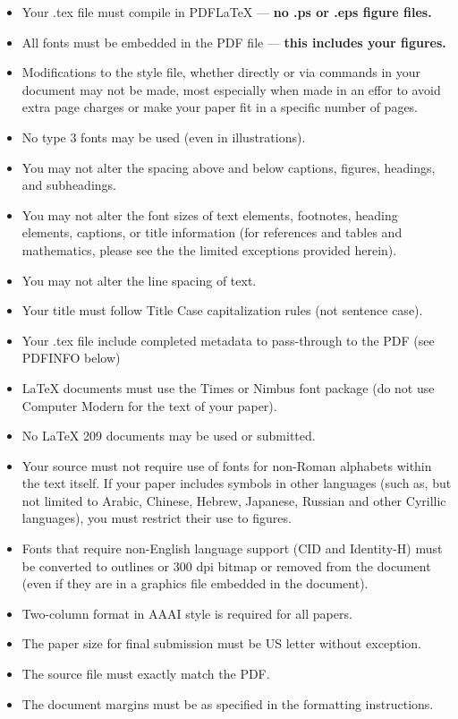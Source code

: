 \documentclass[letterpaper]{article} %
\begin{document}
\begin{itemize}
\item Your .tex file must compile in PDF\LaTeX{} --- \textbf{ no .ps or .eps figure files.}
\item All fonts must be embedded in the PDF file --- \textbf{ this includes your figures.}
\item Modifications to the style file, whether directly or via commands in your document may not be made, most especially when made in an effor to avoid extra page charges or make your paper fit in a specific number of pages.
\item No type 3 fonts may be used (even in illustrations).
\item You may not alter the spacing above and below captions, figures, headings, and subheadings.
\item You may not alter the font sizes of text elements, footnotes, heading elements, captions, or title information (for references and tables and mathematics, please see the the limited exceptions provided herein).
\item You may not alter the line spacing of text.
\item Your title must follow Title Case capitalization rules (not sentence case).
\item Your .tex file include completed metadata to pass-through to the PDF (see PDFINFO below)
\item \LaTeX{} documents must use the Times or Nimbus font package (do not use Computer Modern for the text of your paper).
\item No \LaTeX{} 209 documents may be used or submitted.
\item Your source must not require use of fonts for non-Roman alphabets within the text itself. If your paper includes symbols in other languages (such as, but not limited to Arabic, Chinese, Hebrew, Japanese, Russian and other Cyrillic languages), you must restrict their use to figures.
\item Fonts that require non-English language support (CID and Identity-H) must be converted to outlines or 300 dpi bitmap or removed from the document (even if they are in a graphics file embedded in the document).
\item Two-column format in AAAI style is required for all papers.
\item The paper size for final submission must be US letter without exception.
\item The source file must exactly match the PDF.
\item The document margins must be as specified in the formatting instructions.

\end{itemize}
\end{document}

